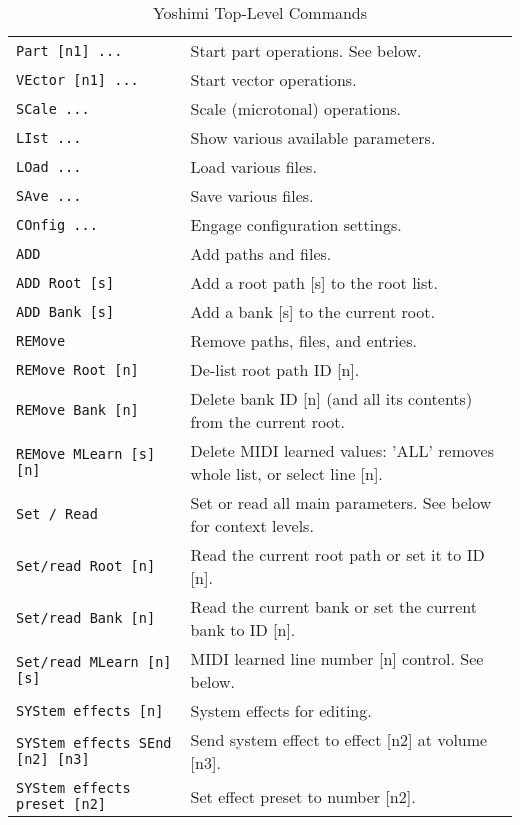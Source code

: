    \begin{table}[H]
      \centering
      \caption{Yoshimi Top-Level Commands}
      \label{table:yoshimi_text_toplevel_commands}
      \begin{tabular}{l l}

\texttt{Part [n1] ...} &
   Start part operations.  See below. \\
\texttt{VEctor [n1] ...} &
   Start vector operations. \\
\texttt{SCale ...} &
   Scale (microtonal) operations. \\
\texttt{LIst ...} &
   Show various available parameters. \\
\texttt{LOad ...} &
   Load various files. \\
\texttt{SAve ...} &
   Save various files. \\
\texttt{COnfig ...} &
   Engage configuration settings. \\
\texttt{ADD} &
   Add paths and files. \\
\texttt{ADD Root [s]} &
   Add a root path [s] to the root list. \\
\texttt{ADD Bank [s]} &
   Add a bank [s] to the current root. \\
\texttt{REMove} &
   Remove paths, files, and entries. \\
\texttt{REMove Root [n]} &
   De-list root path ID [n]. \\
\texttt{REMove Bank [n]} &
   Delete bank ID [n] (and all its contents) from the current root. \\
\texttt{REMove MLearn [s] [n]} &
   Delete MIDI learned values: 'ALL' removes whole list, or select line [n]. \\
\texttt{Set / Read} &
   Set or read all main parameters. See below for context levels. \\
\texttt{Set/read Root [n]} &
   Read the current root path or set it to ID [n]. \\
\texttt{Set/read Bank [n]} &
   Read the current bank or set the current bank to ID [n]. \\
\texttt{Set/read MLearn [n] [s]} &
   MIDI learned line number [n] control.  See below. \\
\texttt{SYStem effects [n]} &
   System effects for editing. \\
\texttt{SYStem effects SEnd [n2] [n3]} &
   Send system effect to effect [n2] at volume [n3]. \\
\texttt{SYStem effects preset [n2]} &
   Set effect preset to number [n2]. \\

\end{tabular}
\end{table}
